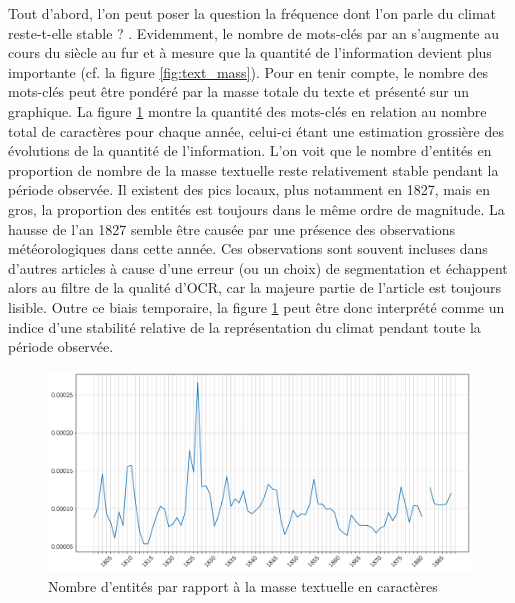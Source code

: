 \documentclass[a4paper,twoside,12pt]{article}
\begin{document}
Tout d'abord, l'on peut poser la question \og la fréquence dont l'on parle du climat reste-t-elle stable ? \fg{}. Evidemment, le nombre de mots-clés par an s'augmente au cours du siècle au fur et à mesure que la quantité de l'information devient plus importante (cf. la figure \ref{fig:text_mass}). Pour en tenir compte, le nombre des mots-clés peut être pondéré par la masse totale du texte et présenté sur un graphique. La figure \ref{fig:entities_per_mass} montre la quantité des mots-clés en relation au nombre total de caractères pour chaque année, celui-ci étant une estimation grossière des évolutions de la quantité de l'information. L'on voit que le nombre d'entités en proportion de nombre de la masse textuelle reste relativement stable pendant la période observée. Il existent des pics locaux, plus notamment en 1827, mais en gros, la proportion des entités est toujours dans le même ordre de magnitude. La hausse de l'an 1827 semble être causée par une présence des observations météorologiques dans cette année. Ces observations sont souvent incluses dans d'autres articles à cause d'une erreur (ou un choix) de segmentation et échappent alors au filtre de la qualité d'OCR, car la majeure partie de l'article est toujours lisible. Outre ce biais temporaire, la figure \ref{fig:entities_per_mass} peut être donc interprété comme un indice d'une stabilité relative de la représentation du climat pendant toute la période observée.

\begin{figure}[h]
    \centering
    \includegraphics[width=\textwidth]{images/entities_per_mass.pdf}
    \caption{Nombre d'entités par rapport à la masse textuelle en caractères}
    \label{fig:entities_per_mass}
\end{figure}
\end{document}

